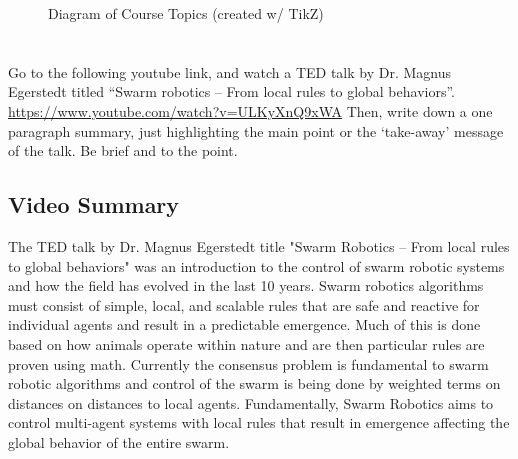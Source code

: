 \documentclass[]{article}
\numberwithin{equation}{section}
\begin{document}
\begin{figure}[h]
	\caption{Diagram of Course Topics (created w/ TikZ)}
	\label{fig:pblm1}
\end{figure}

\newpage
\section{}
Go to the following youtube link, and watch a TED talk by Dr. Magnus Egerstedt titled “Swarm robotics – From local rules to global behaviors”.
\href{https://www.youtube.com/watch?v=ULKyXnQ9xWA}{https://www.youtube.com/watch?v=ULKyXnQ9xWA}
Then, write down a one paragraph summary, just highlighting the main point or the ‘take-away’ message of the talk. 
Be brief and to the point.

\subsection*{Video Summary}
The TED talk by Dr. Magnus Egerstedt title "Swarm Robotics – From local rules to global behaviors" was an introduction to the control of swarm robotic systems and how the field has evolved in the last 10 years.
Swarm robotics algorithms must consist of simple, local, and scalable rules that are safe and reactive for individual agents and result in a predictable emergence.
Much of this is done based on how animals operate within nature and are then particular rules are proven using math.
Currently the consensus problem is fundamental to swarm robotic algorithms and control of the swarm is being done by weighted terms on distances on distances to local agents.
Fundamentally, Swarm Robotics aims to control multi-agent systems with local rules that result in emergence affecting the global behavior of the entire swarm.
\end{document}
